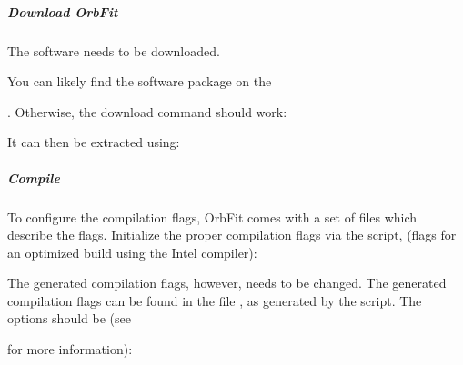 \documentclass[letterpaper,11pt,english]{sphinxmanual}
\begin{document}
\subparagraph{Download OrbFit}
\label{\detokenize{technical/installation/orbfit:download-orbfit}}
\sphinxAtStartPar
The software needs to be downloaded.

\sphinxAtStartPar
You can likely find the software package on the %
\begin{footnote}[39]\sphinxAtStartFootnote
{}
%
\end{footnote}. Otherwise,
the download command should work:

\begin{sphinxVerbatim}[commandchars=\\\{\}]
  
\end{sphinxVerbatim}

\sphinxAtStartPar
It can then be extracted using:

\begin{sphinxVerbatim}[commandchars=\\\{\}]
  
\end{sphinxVerbatim}


\subparagraph{Compile}
\label{\detokenize{technical/installation/orbfit:compile}}
\sphinxAtStartPar
To configure the compilation flags, OrbFit comes with a set of files which
describe the flags. Initialize the proper compilation flags via the
 script, (flags for an optimized build using the Intel
compiler):

\begin{sphinxVerbatim}[commandchars=\\\{\}]
  
\end{sphinxVerbatim}

\sphinxAtStartPar
The generated compilation flags, however, needs to be changed. The generated
compilation flags can be found in the file , as
generated by the  script. The options should be
(see %
\begin{footnote}[40]\sphinxAtStartFootnote
{}
%
\end{footnote} for more information):
\end{document}
